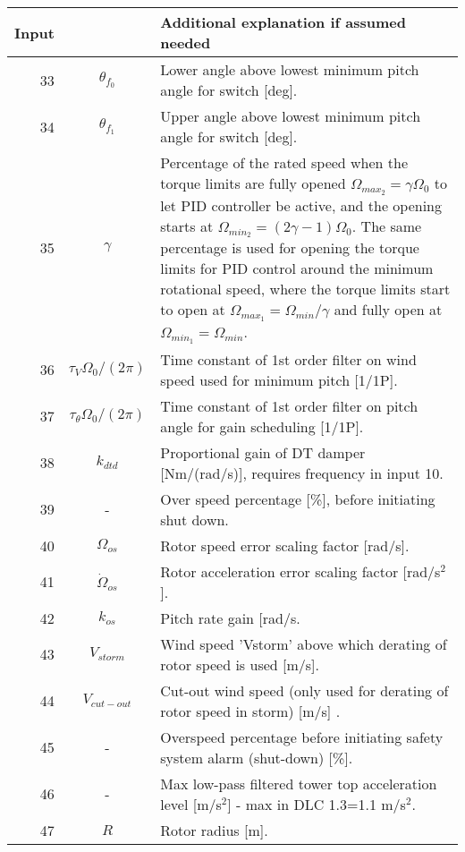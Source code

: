 \begin{table}[t!]
\begin{center}
\begin{tabular}{r|c|p{11.5cm}}
Input &  			& Additional explanation if assumed needed \\ \hline
33 & $\theta_{f_0}$ 	& Lower angle above lowest minimum pitch angle for switch [deg]. \\
34 & $\theta_{f_1}$ 	& Upper angle above lowest minimum pitch angle for switch [deg]. \\
35 & $\gamma$ 		& Percentage of the rated speed when the torque limits are fully opened $\Omega_{max_2}=\gamma\Omega_0$ to let PID controller be active, and the opening starts at $\Omega_{min_2}=(2 \gamma -1)\Omega_0$. The same percentage is used for opening the torque limits for PID control around the minimum rotational speed, where the torque limits start to open at $\Omega_{max_1}=\Omega_{min}/\gamma$ and fully open at $\Omega_{min_1}=\Omega_{min}$. \\
36 & $\tau_V \Omega_0 /(2\pi)$ 		& Time constant of 1st order filter on wind speed used for minimum pitch [1/1P]. \\
37 & $\tau_{\theta} \Omega_0 /(2\pi)$ & Time constant of 1st order filter on pitch angle for gain scheduling [1/1P]. \\
38 & $k_{dtd}$ 		& Proportional gain of DT damper [Nm/(rad/s)], requires frequency in input 10. \\
\hline
39 & - 			& Over speed percentage  [\%], before initiating shut down. \\
\hline
40 & $\Omega_{os}$ 	& Rotor speed error scaling factor  [rad/s]. \\
41 & $\dot{\Omega}_{os}$ & Rotor acceleration error scaling factor  [rad/s${}^2$]. \\
42 & $k_{os}$ 		& Pitch rate gain  [rad/s. \\
\hline
43 & 	$V_{storm}$		& Wind speed 'Vstorm' above which derating of rotor speed is used [m/s]. \\
44 & 	$V_{cut-out}$	& Cut-out wind speed (only used for derating of rotor speed in storm) [m/s]   . \\
\hline
45 &  		-		& Overspeed percentage before initiating safety system alarm (shut-down) [\%]. \\
46 &  		-		& Max low-pass filtered tower top acceleration level [m/s${}^2$] - max in DLC 1.3=1.1 m/s${}^2$. \\
\hline
47 &  		$R$		& Rotor radius [m]. \\

\end{tabular}
\end{center}
\end{table}

